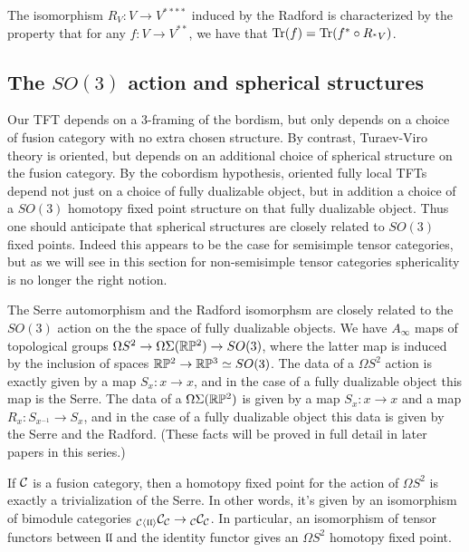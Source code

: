 \documentclass{amsart}
\begin{document}
\begin{lemma} \cite[Cor. 7.4]{MR2097289} \label{lem:characterize-Radford}
The isomorphism $R_V:V \rightarrow V^{****}$ induced by the Radford is characterized by the property that for any $f: V \rightarrow V^{**}$, we have that $\mathrm{Tr}(f) = \mathrm{Tr}(f^* \circ R_{{}^*V})$. 
\end{lemma}


\subsection{The $SO(3)$ action and spherical structures}  

Our TFT depends on a $3$-framing of the bordism, but only depends on a choice of fusion category with no extra chosen structure.  By contrast, Turaev-Viro theory is oriented, but depends on an additional choice of spherical structure on the fusion category.  By the cobordism hypothesis, oriented fully local TFTs depend not just on a choice of fully dualizable object, but in addition a choice of a $SO(3)$ homotopy fixed point structure on that fully dualizable object.  Thus one should anticipate that spherical structures are closely related to $SO(3)$ fixed points.  Indeed this appears to be the case for semisimple tensor categories, but as we will see in this section for non-semisimple tensor categories sphericality is no longer the right notion.

The Serre automorphism and the Radford isomorphsm are closely related to the $SO(3)$ action on the the space of fully dualizable objects.  We have $A_\infty$ maps of topological groups $\Omega S^2 \rightarrow \Omega \Sigma (\mathbb R \mathbb P^2) \rightarrow SO(3)$, where the latter map is induced by the inclusion of spaces $\mathbb R \mathbb P^2 \to \mathbb R \mathbb P^3 \simeq SO(3)$.  The data of a $\Omega S^2$ action is exactly given by a map $S_x: x \rightarrow x$, and in the case of a fully dualizable object this map is the Serre.  The data of a $\Omega \Sigma (\mathbb R \mathbb P^2)$ is given by a map $S_x: x \rightarrow x$ and a map $R_x: S_{x^{-1}} \rightarrow S_x$, and in the case of a fully dualizable object this data is given by the Serre and the Radford.  (These facts will be proved in full detail in later papers in this series.)

If $\mathcal C$ is a fusion category, then a homotopy fixed point for the action of $\Omega S^2$ is exactly a trivialization of the Serre.  In other words, it's given by an isomorphism of bimodule categories ${}_{\mathcal C \langle \mathfrak{l l} \rangle} \mathcal C_\mathcal C \rightarrow {}_{\mathcal C} {\mathcal C}_{\mathcal C}$.  In particular, an isomorphism of tensor functors between $\mathfrak{l l}$ and the identity functor gives an $\Omega S^2$ homotopy fixed point.
\end{document}
